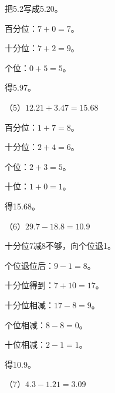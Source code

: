 {
把5.2写成5.20。\par
\smallskip{}百分位：$7+0=7$。\par
\smallskip{}十分位：$7+2=9$。\par
\smallskip{}个位：$0+5=5$。\par
\smallskip{}得5.97。\par
\par\medskip

\noindent\setlength{\parindent}{0pt}
（5）$12.21+3.47=15.68$

百分位：$1+7=8$。\par
\smallskip{}十分位：$2+4=6$。\par
\smallskip{}个位：$2+3=5$。\par
\smallskip{}十位：$1+0=1$。\par
\smallskip{}得15.68。\par
%
\setlength{\parindent}{0pt}
（6）$29.7-18.8=10.9$

十分位7减8不够，向个位退1。\par
\smallskip{}个位退位后：$9-1=8$。\par
\smallskip{}十分位得到：$7+10=17$。\par
\smallskip{}十分位相减：$17-8=9$。\par
\smallskip{}个位相减：$8-8=0$。\par
\smallskip{}十位相减：$2-1=1$。\par
\smallskip{}得10.9。\par
\par\medskip

\noindent\setlength{\parindent}{0pt}
（7）$4.3-1.21=3.09$

}
